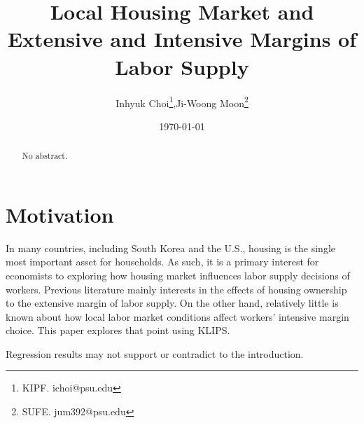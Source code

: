 \documentclass[12pt,letterpaper]{article}
\begin{document}
\title{\textbf{Local Housing Market and Extensive and Intensive Margins of Labor Supply}}%
\author{Inhyuk Choi\footnote{KIPF. ichoi@psu.edu},\quad Ji-Woong Moon\footnote{SUFE. jum392@psu.edu}}
\date{\today}
\maketitle
\begin{abstract}
No abstract.
\end{abstract}

\section{Motivation}
In many countries, including South Korea and the U.S., housing is the single most important asset for households. As such, it is a primary interest for economists to exploring how housing market influences labor supply decisions of workers. Previous literature mainly interests in the effects of housing ownership to the extensive margin of labor supply. On the other hand, relatively little is known about how local labor market conditions affect workers' intensive margin choice. This paper explores that point using KLIPS. 


Regression results may not support or contradict to the introduction. 

\bigskip
\end{document}
